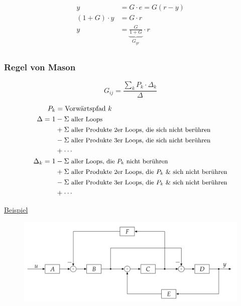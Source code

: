 \documentclass[
  10pt,
  a4paper,
  twocolumn]{article}
\numberwithin{equation}{section}
\begin{document}
\[
\begin{split}
y &= G\cdot e = G(r-y)\\
(1+G)\cdot y &= G\cdot r \\
y &= \underbrace{\frac{G}{1+G}}_{G_{yr}} \cdot r\\
\end{split}
\]

\hypertarget{regel-von-mason}{%
\subsubsection{Regel von Mason}\label{regel-von-mason}}

\[
G_{ij} = \frac{\sum_k P_k\cdot\Delta_k}{\Delta}
\]

\[
\begin{split}
P_k &= \text{Vorwärtspfad } k\\
\Delta = 1 &- \small{\Sigma\text{ aller Loops}} \\
           &+ \small{\Sigma\text{ aller Produkte 2er Loops, die sich nicht berühren}} \\
           &- \small{\Sigma\text{ aller Produkte 3er Loops, die sich nicht berühren}} \\
           &+ \cdots \\
\Delta_k = 1 &- \small{\Sigma\text{ aller Loops, die $P_k$ nicht berühren}} \\
             &+ \small{\Sigma\text{ aller Produkte 2er Loops, die $P_k$ \& sich nicht berühren}} \\
             &- \small{\Sigma\text{ aller Produkte 3er Loops, die $P_k$ \& sich nicht berühren}} \\
             &+ \cdots \\
\end{split}
\]

\ul{Beispiel}

\begin{figure}[H]

{\centering \includegraphics{images/paste-65.png}

}

\end{figure}
\end{document}
